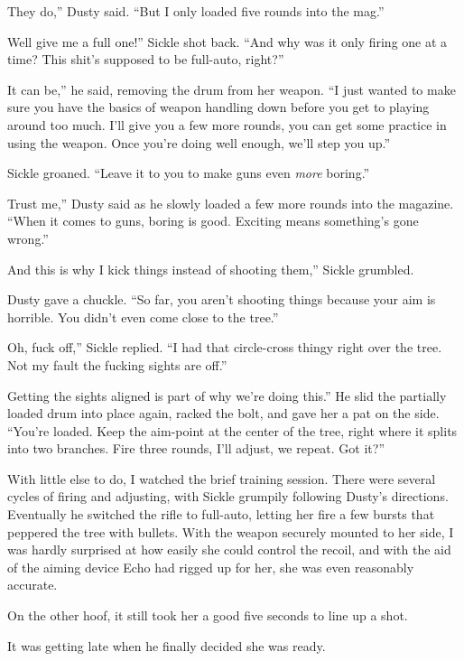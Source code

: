\leavevmode{}They do,” Dusty said. “But I only loaded five rounds into the mag.”

\leavevmode{}Well give me a full one!” Sickle shot back. “And why was it only firing one at a time? This shit’s supposed to be full-auto, right?”

\leavevmode{}It can be,” he said, removing the drum from her weapon. “I just wanted to make sure you have the basics of weapon handling down before you get to playing around too much. I’ll give you a few more rounds, you can get some practice in using the weapon. Once you’re doing well enough, we’ll step you up.”

Sickle groaned. “Leave it to you to make guns even \textit{more} boring.”

\leavevmode{}Trust me,” Dusty said as he slowly loaded a few more rounds into the magazine. “When it comes to guns, boring is good. Exciting means something’s gone wrong.”

\leavevmode{}And this is why I kick things instead of shooting them,” Sickle grumbled.

Dusty gave a chuckle. “So far, you aren’t shooting things because your aim is horrible. You didn’t even come close to the tree.”

\leavevmode{}Oh, fuck off,” Sickle replied. “I had that circle-cross thingy right over the tree. Not my fault the fucking sights are off.”

\leavevmode{}Getting the sights aligned is part of why we’re doing this.” He slid the partially loaded drum into place again, racked the bolt, and gave her a pat on the side. “You’re loaded. Keep the aim-point at the center of the tree, right where it splits into two branches. Fire three rounds, I’ll adjust, we repeat. Got it?”

With little else to do, I watched the brief training session. There were several cycles of firing and adjusting, with Sickle grumpily following Dusty’s directions. Eventually he switched the rifle to full-auto, letting her fire a few bursts that peppered the tree with bullets. With the weapon securely mounted to her side, I was hardly surprised at how easily she could control the recoil, and with the aid of the aiming device Echo had rigged up for her, she was even reasonably accurate.

On the other hoof, it still took her a good five seconds to line up a shot.

It was getting late when he finally decided she was ready.

